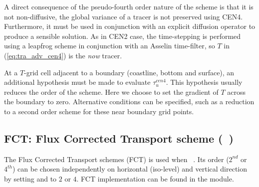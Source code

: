 \documentclass[../main/NEMO_manual]{subfiles}
\begin{document}
A direct consequence of the pseudo-fourth order nature of the scheme is that it is not non-diffusive,
\ie the global variance of a tracer is not preserved using CEN4.
Furthermore, it must be used in conjunction with an explicit diffusion operator to produce a sensible solution.
As in CEN2 case, the time-stepping is performed using a leapfrog scheme in conjunction with an Asselin time-filter,
so $T$ in (\autoref{eq:tra_adv_cen4}) is the \textit{now} tracer.

At a $T$-grid cell adjacent to a boundary (coastline, bottom and surface),
an additional hypothesis must be made to evaluate $\tau_u^{cen4}$.
This hypothesis usually reduces the order of the scheme.
Here we choose to set the gradient of $T$ across the boundary to zero.
Alternative conditions can be specified, such as a reduction to a second order scheme for
these near boundary grid points.

\subsection{FCT: Flux Corrected Transport scheme (\protect{}~)}
\label{subsec:TRA_adv_tvd}

The Flux Corrected Transport schemes (FCT) is used when ~.
Its order ($2^{nd}$ or $4^{th}$) can be chosen independently on horizontal (iso-level) and vertical direction by
setting  and  to $2$ or $4$.
FCT implementation can be found in the  module.
\end{document}
